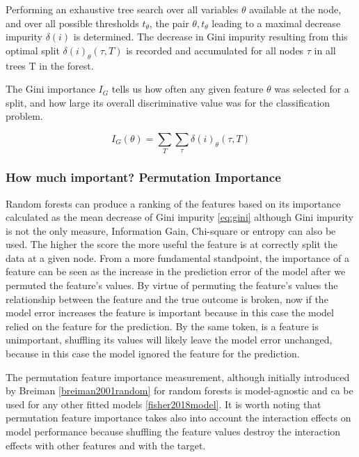 \documentclass[preprint,12pt]{elsarticle}
\begin{document}
Performing an exhaustive tree search over all variables $\theta$ available at the node, and over all possible thresholds $t_\theta$, the pair $\theta, t_{\theta}$ leading to a maximal decrease impurity $\delta(i)$ is determined. The decrease in Gini impurity resulting from this optimal split $\delta(i)_{\theta}(\tau, T)$ is recorded and accumulated for all nodes $\tau$ in all trees T in the forest. 

The Gini importance $I_G$ tells us how often any given feature $\theta$ was selected for a split, and how large its overall discriminative value was for the classification problem.

\begin{equation}
I_{G}(\theta) = \sum_T \sum_{\tau} \delta(i)_{\theta}(\tau,T)
\label{eq:gini}
\end{equation}


\subsubsection{How much important? Permutation Importance}
Random forests can produce a ranking of the features based on its importance calculated as the mean decrease of Gini impurity \ref{eq:gini} although Gini impurity is not the only measure, Information Gain, Chi-square or entropy can also be used. The higher the score the more useful the feature is at correctly split the data at a given node.
From a more fundamental standpoint, the importance of a feature can be seen as the increase in the prediction error of the model after we permuted the feature’s values. By virtue of permuting the feature’s values the relationship between the feature and the true outcome is broken, now if the model error increases the feature is important because in this case the model relied on the feature for the prediction. By the same token, is a feature is unimportant, shuffling its values will likely leave the model error unchanged, because in this case the model ignored the feature for the prediction.

The permutation feature importance measurement, although initially introduced by Breiman \ref{breiman2001random} for random forests is model-agnostic and ca be used for any other fitted models \ref{fisher2018model}.
It is worth noting that permutation feature importance takes also into account the interaction effects on model performance because shuffling the feature values destroy the interaction effects with other features and with the  target.  
\end{document}
